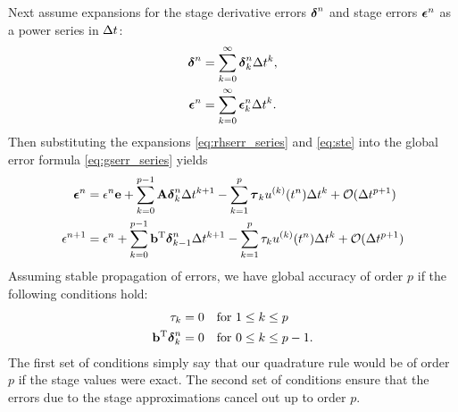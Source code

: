 Next assume expansions for the stage derivative errors $\boldsymbol{\delta}^n$ and
stage errors $\boldsymbol{\epsilon}^n$ as a power series in $\Delta t$:
\begin{subequations} \label{eq:err_series}
\begin{align} \label{eq:rhserr_series}
\boldsymbol{\delta}^n & = \sum_{k=0}^{\infty} \boldsymbol{\delta}_k^n \Delta t^{k}, \\
\boldsymbol{\epsilon}^n & = \sum_{k=0}^{\infty} \boldsymbol{\epsilon}_k^n \Delta t^{k}.
\label{eq:gserr_power_series}
\end{align}
\end{subequations}
Then substituting the expansions \eqref{eq:rhserr_series} and \eqref{eq:ste}
into the global error formula \eqref{eq:gserr_series} yields
\begin{subequations} \label{eq:gserr_rec_both}
\begin{align} \label{eq:gserr_rec}
\boldsymbol{\epsilon}^n & = \epsilon^n \mathbf{e} + \sum_{k=0}^{p-1} \mathbf{A} \boldsymbol{\delta}^n_k \Delta t^{k+1} -\sum_{k=1}^{p} \boldsymbol{\tau}_k u^{(k)}(t^{n}) \Delta t^k + {\cal O}(\Delta t^{p+1}) \\
\epsilon^{n+1} & = \epsilon^n + \sum_{k=0}^{p-1} \mathbf{b}^\mathrm{T}\boldsymbol{\delta}^n_{k-1} \Delta t^{k+1} -\sum_{k=1}^{p} \tau_k u^{(k)}(t^{n}) \Delta t^k + {\cal O}(\Delta t^{p+1}) 
\end{align}
\end{subequations}
Assuming stable propagation of errors, we have global accuracy of order $p$
if the following conditions hold:
\begin{align*}    
\tau_k & = 0  & \mbox{for }  & 1\le k\le p \\
\mathbf{b}^\mathrm{T}\boldsymbol{\delta}^n_k & = 0 &  \mbox{for } & 0\le k\le p-1.
\end{align*}
The first set of conditions simply say that our quadrature rule would be of order $p$
if the stage values were exact.
The second set of conditions ensure that the errors due to the stage approximations
cancel out up to order $p$.

